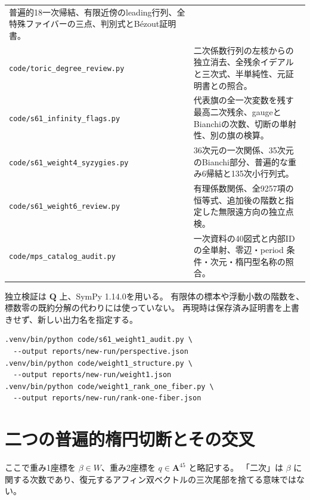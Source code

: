 \documentclass[11pt,a4paper]{ltjsarticle}
\newcommand{\QQ}{\mathbf Q}
\renewcommand{\AA}{\mathbf A}
\theoremstyle{remark}
\begin{document}
\begin{longtable}{@{}p{58mm}p{98mm}@{}}
普遍的18一次帰結、有限近傍のleading行列、全特殊ファイバーの三点、判別式とB\'ezout証明書。\\
\nolinkurl{code/toric_degree_review.py} &
二次係数行列の左核からの独立消去、全残余イデアルと三次式、半単純性、元証明書との照合。\\
\nolinkurl{code/s61_infinity_flags.py} &
代表旗の全一次変数を残す最高二次残余、gaugeとBianchiの次数、切断の単射性、別の旗の検算。\\
\nolinkurl{code/s61_weight4_syzygies.py} &
36次元の一次関係、35次元のBianchi部分、普遍的な重み6帰結と135次小行列式。\\
\nolinkurl{code/s61_weight6_review.py} &
有理係数関係、全9257項の恒等式、追加後の階数と指定した無限遠方向の独立点検。\\
\nolinkurl{code/mps_catalog_audit.py} &
一次資料の40図式と内部IDの全単射、零辺・period 条件・次元・楕円型名称の照合。\\
\bottomrule
\end{longtable}

独立検証は $\QQ$ 上、SymPy 1.14.0を用いる。
有限体の標本や浮動小数の階数を、標数零の既約分解の代わりには使っていない。
再現時は保存済み証明書を上書きせず、新しい出力名を指定する。
\begin{verbatim}
.venv/bin/python code/s61_weight1_audit.py \
  --output reports/new-run/perspective.json
.venv/bin/python code/weight1_structure.py \
  --output reports/new-run/weight1.json
.venv/bin/python code/weight1_rank_one_fiber.py \
  --output reports/new-run/rank-one-fiber.json
\end{verbatim}


\section{二つの普遍的楕円切断とその交叉}\label{sec:universal-sections}
ここで重み1座標を $\beta\in W$、重み2座標を $q\in\AA^{45}$ と略記する。
「二次」は $\beta$ に関する次数であり、復元するアフィン双ベクトルの三次尾部を捨てる意味ではない。
\end{document}
